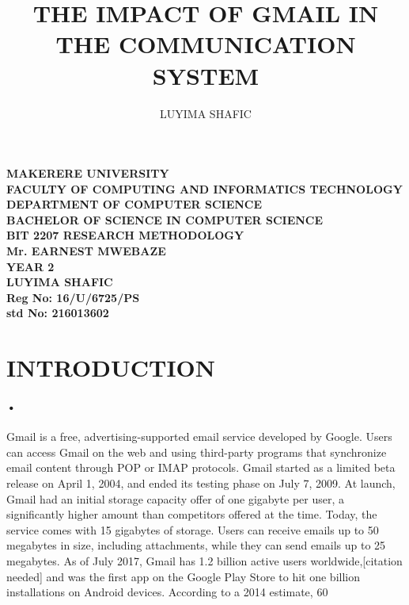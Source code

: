 \documentclass[a4paper,12pt]{article}
\begin{document}
\begin{Huge}
\begin{center}
\begin{normalsize}

\textbf{MAKERERE UNIVERSITY } \\
\textbf{FACULTY OF COMPUTING AND INFORMATICS TECHNOLOGY} \\
\textbf{DEPARTMENT OF COMPUTER SCIENCE} \\
\textbf{BACHELOR OF SCIENCE IN COMPUTER SCIENCE} \\
\textbf{BIT 2207 RESEARCH METHODOLOGY} \\
\textbf{Mr. EARNEST MWEBAZE} \\
\textbf{YEAR 2} \\


\textbf{\sc LUYIMA SHAFIC } \\
\textbf{\sc Reg No: 16/U/6725/PS } \\
\textbf{\sc std No: 216013602}\\
\end{normalsize}
\end{center}
\end{Huge}
\newpage

\newpage

\title{THE IMPACT OF GMAIL IN THE COMMUNICATION SYSTEM}
\author{LUYIMA SHAFIC}      
\renewcommand{\today}{}

\maketitle

\newpage
    
\section{INTRODUCTION}
\paragraph{•}
Gmail is a free, advertising-supported email service developed by Google. Users can access Gmail on the web and using third-party programs that synchronize email content through POP or IMAP protocols. Gmail started as a limited beta release on April 1, 2004, and ended its testing phase on July 7, 2009.
At launch, Gmail had an initial storage capacity offer of one gigabyte per user, a significantly higher amount than competitors offered at the time. Today, the service comes with 15 gigabytes of storage. Users can receive emails up to 50 megabytes in size, including attachments, while they can send emails up to 25 megabytes. 
As of July 2017, Gmail has 1.2 billion active users worldwide,[citation needed] and was the first app on the Google Play Store to hit one billion installations on Android devices. According to a 2014 estimate, 60%
\end{document}
